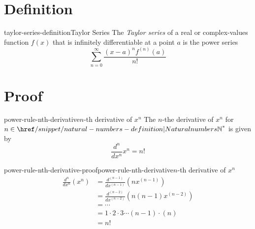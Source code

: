 \documentclass[preview]{standalone}
\begin{document}
\genpage

\section{Definition}

\begin{snippetdefinition}{taylor-series-definition}{Taylor Series}
    The \textit{Taylor series} of a real or complex-values function \(f(x)\)
    that is infinitely differentiable at a point \(a\) is the power series
    \[
        \sum_{n=0}^{\infty}\frac{{(x-a)}^n f^{(n)}(a)}{n!}
    \]
\end{snippetdefinition}

\section{Proof}

\begin{snippetproposition}{power-rule-nth-derivative}{\(n\)-th derivative of \(x^n\)}
    The \(n\)-the derivative of \(x^n\) for \(n \in {\naturalnumbers}^*\)
    is given by
    \[
        \frac{d^n}{dx^n} x^n = n!
    \]
\end{snippetproposition}

\begin{snippetproof}{power-rule-nth-derivative-proof}{power-rule-nth-derivative}{\(n\)-th derivative of \(x^n\)}
    \begin{align*}
        \frac{d^n}{dx^n}\left(x^n\right)
        &=\frac{d^{(n-1)}}{dx^{(n-1)}}\left(nx^{(n-1)}\right)\\
        &=\frac{d^{(n-2)}}{dx^{(n-2)}}\left(n(n-1)x^{(n-2)}\right)\\
        &=\cdots\\
        &=1\cdot 2 \cdot 3 \cdots (n-1) \cdot (n) \\
        &=n!
    \end{align*}
\end{snippetproof}
\end{document}
